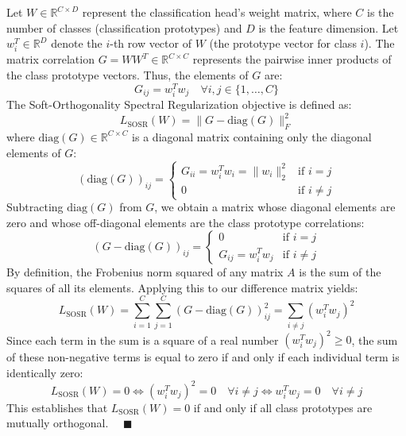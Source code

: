\documentclass{article}
\theoremstyle{plain}
\theoremstyle{definition}
\theoremstyle{remark}
\begin{document}
Let $W \in \mathbb{R}^{C \times D}$ represent the classification head's weight matrix, where $C$ is the number of classes (classification prototypes) and $D$ is the feature dimension. Let $w_i^T \in \mathbb{R}^{D}$ denote the $i$-th row vector of $W$ (the prototype vector for class $i$).
The matrix correlation $G = W W^T \in \mathbb{R}^{C \times C}$ represents the pairwise inner products of the class prototype vectors. Thus, the elements of $G$ are:
\begin{equation}
  G_{ij} = w_i^T w_j \quad \forall i, j \in \{1, \dots, C\}
\end{equation}
The Soft-Orthogonality Spectral Regularization objective is defined as:
\begin{equation}
  L_{\text{SOSR}}(W) = \|G - \text{diag}(G)\|_F^2
\end{equation}
where $\text{diag}(G) \in \mathbb{R}^{C \times C}$ is a diagonal matrix containing only the diagonal elements of $G$:
\begin{equation}
  (\text{diag}(G))_{ij} = \begin{cases} G_{ii} = w_i^T w_i = \|w_i\|_2^2 & \text{if } i = j \\ 0 & \text{if } i \neq j \end{cases}
\end{equation}
Subtracting $\text{diag}(G)$ from $G$, we obtain a matrix whose diagonal elements are zero and whose off-diagonal elements are the class prototype correlations:
\begin{equation}
  (G - \text{diag}(G))_{ij} = \begin{cases} 0 & \text{if } i = j \\ G_{ij} = w_i^T w_j & \text{if } i \neq j \end{cases}
\end{equation}
By definition, the Frobenius norm squared of any matrix $A$ is the sum of the squares of all its elements. Applying this to our difference matrix yields:
\begin{equation}
  L_{\text{SOSR}}(W) = \sum_{i=1}^C \sum_{j=1}^C (G - \text{diag}(G))_{ij}^2 = \sum_{i \neq j} (w_i^T w_j)^2
\end{equation}
Since each term in the sum is a square of a real number $(w_i^T w_j)^2 \geq 0$, the sum of these non-negative terms is equal to zero if and only if each individual term is identically zero:
\begin{equation}
  L_{\text{SOSR}}(W) = 0 \iff (w_i^T w_j)^2 = 0 \quad \forall i \neq j \iff w_i^T w_j = 0 \quad \forall i \neq j
\end{equation}
This establishes that $L_{\text{SOSR}}(W) = 0$ if and only if all class prototypes are mutually orthogonal. $\quad \blacksquare$
\end{document}
